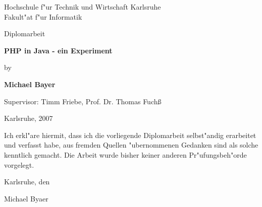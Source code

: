 

\pagestyle{empty}
\sffamily

\noindent
\begin{center}
    \Large
    Hochschule f"ur Technik und Wirtschaft Karlsruhe\\
    Fakult"at f"ur Informatik\\
\end{center}

\vfill\vfill
\begin{center}
    \large
    Diplomarbeit\\
\end{center}

\vfill
\begin{center}
    \Huge\bfseries
    PHP in Java - ein Experiment
\end{center}

\vfill
\begin{center}
    \Large
    by
\end{center}

\vfill
\begin{center}
    \huge\bfseries
    Michael Bayer
\end{center}

\vfill\vfill\vfill
\begin{center}
    \Large
    Supervisor: Timm Friebe,  Prof. Dr. Thomas Fuch\ss
\end{center}

\vfill
\begin{center}
\large
    Karlsruhe, 2007
\end{center}

\cleardoublepage

\pagestyle{empty}
Ich erkl"are hiermit, dass ich die vorliegende Diplomarbeit 
selbst"andig erarbeitet und verfasst habe, aus fremden Quellen 
"ubernommenen Gedanken sind als solche kenntlich gemacht. Die Arbeit 
wurde bisher keiner anderen Pr"ufungsbeh"orde vorgelegt. 

\vspace{1cm}
Karlsruhe, den 

\vspace{2cm}
\hfill Michael Byaer

